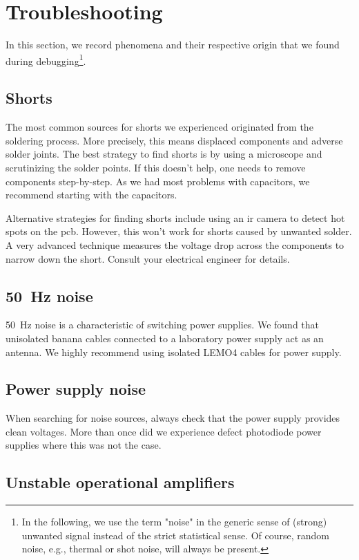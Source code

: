 \section{Troubleshooting}

In this section, we record phenomena and their respective origin that we found during debugging\footnote{In the following, we use the term "noise" in the generic sense of (strong) unwanted signal instead of the strict statistical sense. Of course, random noise, e.g., thermal or shot noise, will always be present.}.

\subsection{Shorts}

The most common sources for shorts we experienced originated from the soldering process.
More precisely, this means displaced components and adverse solder joints.
The best strategy to find shorts is by using a microscope and scrutinizing the solder points.
If this doesn't help, one needs to remove components step-by-step.
As we had most problems with capacitors, we recommend starting with the capacitors.

Alternative strategies for finding shorts include using an \gls{ir} camera to detect hot spots on the \gls{pcb}.
However, this won't work for shorts caused by unwanted solder.
A very advanced technique measures the voltage drop across the components to narrow down the short.
Consult your electrical engineer for details.

\subsection{\SI{50}{\hertz} noise}

\SI{50}{\hertz} noise is a characteristic of switching power supplies.
We found that unisolated banana cables connected to a laboratory power supply act as an antenna.
We highly recommend using isolated LEMO4 cables for power supply.

\subsection{Power supply noise}

When searching for noise sources, always check that the power supply provides clean voltages.
More than once did we experience defect photodiode power supplies where this was not the case.

\subsection{Unstable operational amplifiers}

